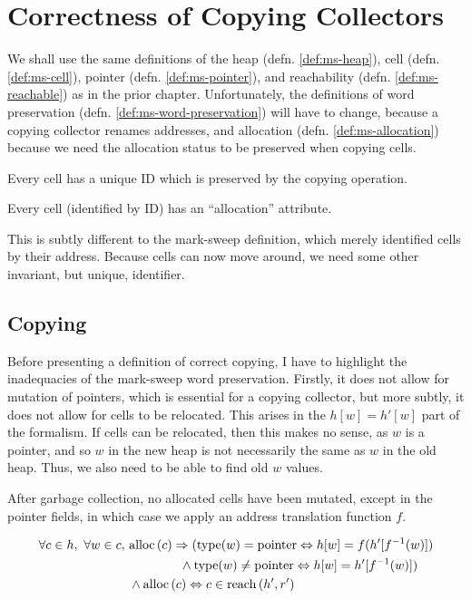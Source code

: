 \chapter{Correctness of Copying Collectors}
\label{sec:copying}

We shall use the same definitions of the \gls{heap}
(defn. \ref{def:ms-heap}), \gls{cell} (defn. \ref{def:ms-cell}),
\gls{pointer} (defn. \ref{def:ms-pointer}), and reachability
(defn. \ref{def:ms-reachable}) as in the prior chapter. Unfortunately,
the definitions of word preservation
(defn. \ref{def:ms-word-preservation}) will have to change, because a
\gls{copying} \gls{collector} renames addresses, and allocation
(defn. \ref{def:ms-allocation}) because we need the allocation status
to be preserved when copying cells.

\begin{definition}[Cell ID]
  \label{def:c-cell-id}
  Every cell has a unique ID which is preserved by the copying
  operation.
\end{definition}

\begin{definition}[Allocation]
  \label{def:c-allocation}
  Every cell (identified by ID) has an ``allocation'' attribute.
\end{definition}

This is subtly different to the mark-sweep definition, which merely
identified cells by their address. Because cells can now move around,
we need some other invariant, but unique, identifier.

\section{Copying}
\label{sec:copying-copying}

Before presenting a definition of correct copying, I have to highlight
the inadequacies of the \gls{mark-sweep} word preservation. Firstly,
it does not allow for mutation of \glspl{pointer}, which is essential
for a \gls{copying} \gls{collector}, but more subtly, it does not
allow for \glspl{cell} to be relocated. This arises in the $h[w] =
h'[w]$ part of the formalism. If \glspl{cell} can be relocated, then
this makes no sense, as $w$ is a \gls{pointer}, and so $w$ in the new
\gls{heap} is not necessarily the same as $w$ in the old
\gls{heap}. Thus, we also need to be able to find old $w$ values.

\begin{definition}
  \label{def:c-correct-copying}
  After garbage collection, no allocated cells have been mutated,
  except in the pointer fields, in which case we apply an address
  translation function $f$.

  \begin{align*}
    \forall c \in h,\ \forall w \in c,\ &\mathrm{alloc}\left(c\right) \Rightarrow
    (\mathrm{type}(w) = \mathrm{pointer} \Leftrightarrow h[w] = f(h'[f^{-1}(w)])\\
    &\quad\quad\quad\quad \land \mathrm{type}(w) \neq \mathrm{pointer}
    \Leftrightarrow h[w] = h'[f^{-1}(w)])\\
    &\land \mathrm{alloc}\left(c\right) \Leftrightarrow c \in \mathrm{reach}\left(h', r'\right)
  \end{align*}
\end{definition}


